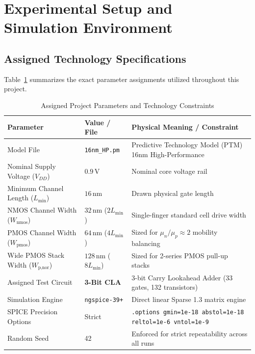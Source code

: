 \documentclass[11pt,a4paper]{article}
\begin{document}
\section{Experimental Setup and Simulation Environment}
\subsection{Assigned Technology Specifications}
Table~\ref{tab:assignment_specs} summarizes the exact parameter assignments utilized throughout this project.

\begin{table}[H]
\centering
\caption{Assigned Project Parameters and Technology Constraints}
\label{tab:assignment_specs}
\small
\begin{tabularx}{\textwidth}{llX}
\toprule
\textbf{Parameter} & \textbf{Value / File} & \textbf{Physical Meaning / Constraint} \\
\midrule
Model File & \texttt{16nm\_HP.pm} & Predictive Technology Model (PTM) 16nm High-Performance \\
Nominal Supply Voltage ($V_{DD}$) & $0.9\,\text{V}$ & Nominal core voltage rail \\
Minimum Channel Length ($L_{\min}$) & $16\,\text{nm}$ & Drawn physical gate length \\
NMOS Channel Width ($W_{\text{nmos}}$) & $32\,\text{nm}$ ($2 L_{\min}$) & Single-finger standard cell drive width \\
PMOS Channel Width ($W_{\text{pmos}}$) & $64\,\text{nm}$ ($4 L_{\min}$) & Sized for $\mu_n / \mu_p \approx 2$ mobility balancing \\
Wide PMOS Stack Width ($W_{\text{p,nor}}$) & $128\,\text{nm}$ ($8 L_{\min}$) & Sized for 2-series PMOS pull-up stacks \\
Assigned Test Circuit & \textbf{3-Bit CLA} & 3-bit Carry Lookahead Adder (33 gates, 132 transistors) \\
Simulation Engine & \texttt{ngspice-39+} & Direct linear Sparse 1.3 matrix engine \\
SPICE Precision Options & Strict & \texttt{.options gmin=1e-18 abstol=1e-18 reltol=1e-6 vntol=1e-9} \\
Random Seed & 42 & Enforced for strict repeatability across all runs \\
\bottomrule
\end{tabularx}
\end{table}
\end{document}
